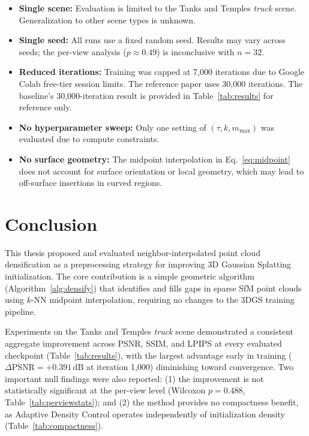 \documentclass[12pt, a4paper]{article}
\begin{document}
\begin{itemize}
    \item \textbf{Single scene:} Evaluation is limited to the Tanks and Temples
    \textit{truck} scene. Generalization to other scene types is unknown.

    \item \textbf{Single seed:} All runs use a fixed random seed. Results may
    vary across seeds; the per-view analysis ($p \approx 0.49$) is inconclusive
    with $n = 32$.

    \item \textbf{Reduced iterations:} Training was capped at 7{,}000 iterations
    due to Google Colab free-tier session limits. The reference paper uses 30{,}000
    iterations. The baseline's 30{,}000-iteration result is provided in
    Table~\ref{tab:results} for reference only.

    \item \textbf{No hyperparameter sweep:} Only one setting of $(\tau, k, m_\text{max})$
    was evaluated due to compute constraints.

    \item \textbf{No surface geometry:} The midpoint interpolation in
    Eq.~\eqref{eq:midpoint} does not account for surface orientation or local
    geometry, which may lead to off-surface insertions in curved regions.
\end{itemize}

\section{Conclusion}

This thesis proposed and evaluated neighbor-interpolated point cloud densification
as a preprocessing strategy for improving 3D Gaussian Splatting initialization.
The core contribution is a simple geometric algorithm (Algorithm~\ref{alg:densify})
that identifies and fills gaps in sparse SfM point clouds using $k$-NN midpoint
interpolation, requiring no changes to the 3DGS training pipeline.

Experiments on the Tanks and Temples \textit{truck} scene demonstrated a consistent
aggregate improvement across PSNR, SSIM, and LPIPS at every evaluated checkpoint
(Table~\ref{tab:results}), with the largest advantage early in training
($\Delta\text{PSNR} = +0.391\,\text{dB}$ at iteration 1{,}000) diminishing toward
convergence. Two important null findings were also reported: (1) the improvement is
not statistically significant at the per-view level (Wilcoxon $p = 0.488$,
Table~\ref{tab:perviewstats}); and (2) the method provides no compactness benefit,
as Adaptive Density Control operates independently of initialization density
(Table~\ref{tab:compactness}).
\end{document}
